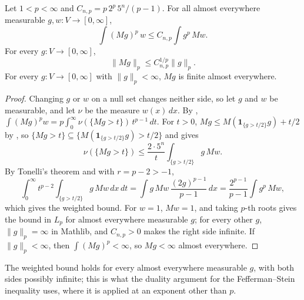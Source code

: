 \begin{theorem}
\label{thm:maximal-strong-type}
\leanok
{}
Let $1 < p < \infty$ and $C_{n,p} = p \, 2^p \, 5^n / (p - 1)$. For all almost everywhere
measurable $g, w : V \to [0, \infty]$,
\[
  \int (M g)^p \, w \leq C_{n,p} \int g^p \, M w .
\]
For every $g : V \to [0, \infty]$,
\[
  \|M g\|_p \leq C_{n,p}^{1/p} \|g\|_p .
\]
For every $g : V \to [0, \infty]$ with $\|g\|_p < \infty$, $M g$ is finite almost everywhere.
\end{theorem}

\begin{proof}
\leanok
Changing $g$ or $w$ on a null set changes neither side, so let $g$ and $w$ be measurable, and let
$\nu$ be the measure $w(x) \, dx$. By ,
$\int (M g)^p w = p \int_0^\infty \nu(\{M g > t\}) \, t^{p-1} \, dt$. For $t > 0$,
$M g \leq M(\mathbf 1_{\{g > t/2\}} g) + t/2$ by , so
$\{M g > t\} \subseteq \{M(\mathbf 1_{\{g > t/2\}} g) > t/2\}$ and 
gives
\[
  \nu(\{M g > t\}) \leq \frac{2 \cdot 5^n}{t} \int_{\{g > t/2\}} g \, M w .
\]
By Tonelli's theorem and  with $r = p - 2 > -1$,
\[
  \int_0^\infty t^{p-2} \int_{\{g > t/2\}} g \, M w \, dx \, dt
  = \int g \, M w \, \frac{(2 g)^{p-1}}{p - 1} \, dx
  = \frac{2^{p-1}}{p - 1} \int g^p \, M w ,
\]
which gives the weighted bound. For $w = 1$, $M w = 1$, and taking $p$-th roots gives the bound
in $L_p$ for almost everywhere measurable $g$; for every other $g$, $\|g\|_p = \infty$ in
Mathlib, and $C_{n,p} > 0$ makes the right side infinite. If $\|g\|_p < \infty$, then
$\int (M g)^p < \infty$, so $M g < \infty$ almost everywhere.
\end{proof}

The weighted bound holds for every almost everywhere measurable $g$, with both sides possibly
infinite; this is what the duality argument for the Fefferman--Stein inequality uses, where it is
applied at an exponent other than $p$.

